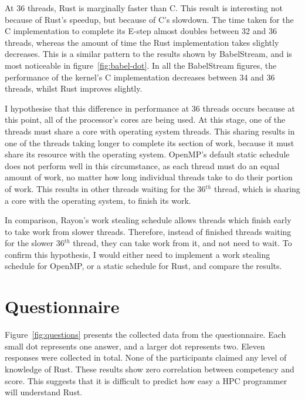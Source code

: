 At 36 threads, Rust is marginally faster than C. This result is interesting not because of Rust's speedup, but because of C's slowdown. The time taken for the C implementation to complete its E-step almost doubles between 32 and 36 threads, whereas the amount of time the Rust implementation takes slightly decreases. This is a similar pattern to the results shown by BabelStream, and is most noticeable in figure~\ref{fig:babel-dot}.
In all the BabelStream figures, the performance of the kernel's C implementation decreases between 34 and 36 threads, whilst Rust improves slightly.

I hypothesise that this difference in performance at 36 threads occurs because at this point, all of the processor's cores are being used. At this stage, one of the threads must share a core with operating system threads. This sharing results in one of the threads taking longer to complete its section of work, because it must share its resource with the operating system. OpenMP's default static schedule does not perform well in this circumstance, as each thread must do an equal amount of work, no matter how long individual threads take to do their portion of work.
This results in other threads waiting for the 36$^{th}$ thread, which is sharing a core with the operating system, to finish its work.

In comparison, Rayon's work stealing schedule allows threads which finish early to take work from slower threads. Therefore, instead of finished threads waiting for the slower 36$^{th}$ thread, they can take work from it, and not need to wait. To confirm this hypothesis, I would either need to implement a work stealing schedule for OpenMP, or a static schedule for Rust, and compare the results.

\section{Questionnaire}
Figure~\ref{fig:questions} presents the collected data from the questionnaire. Each small dot represents one answer, and a larger dot represents two. Eleven responses were collected in total. None of the participants claimed any level of knowledge of Rust.
These results show zero correlation between competency and score. This suggests that it is difficult to predict how easy a HPC programmer will understand Rust. 

